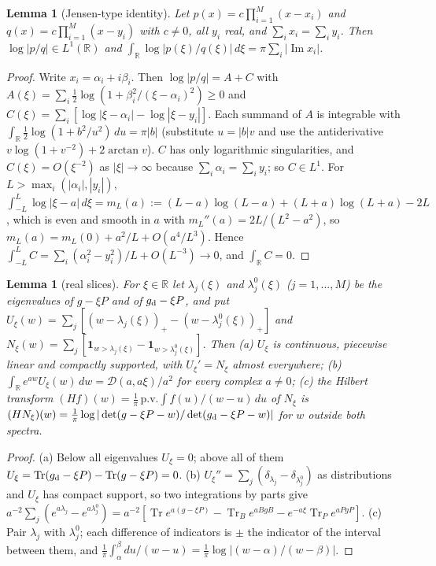 \documentclass[11pt]{amsart}
\newtheorem{lemma}[theorem]{Lemma}
\theoremstyle{definition}
\theoremstyle{remark}
\numberwithin{equation}{section}
\newcommand{\R}{\mathbb{R}}
\newcommand{\Tr}{\operatorname{Tr}}
\newcommand{\one}{\mathbf{1}}
\newcommand{\cD}{\mathcal{D}}
\renewcommand{\Im}{\operatorname{Im}}
\begin{document}
\begin{lemma}[Jensen-type identity]\label{lem:jensen}
Let $p(x)=c\prod_{i=1}^M(x-x_i)$ and $q(x)=c\prod_{i=1}^M(x-y_i)$ with $c\ne0$, all $y_i$ real, and
$\sum_ix_i=\sum_iy_i$. Then $\log|p/q|\in L^1(\R)$ and $\int_\R\log|p(\xi)/q(\xi)|\,d\xi=\pi\sum_i|\Im x_i|$.
\end{lemma}

\begin{proof}
Write $x_i=\alpha_i+i\beta_i$. Then $\log|p/q|=A+C$ with $A(\xi)=\sum_i\frac12\log(1+\beta_i^2/(\xi-\alpha_i)^2)\ge0$
and $C(\xi)=\sum_i[\log|\xi-\alpha_i|-\log|\xi-y_i|]$. Each summand of $A$ is integrable with
$\int_\R\frac12\log(1+b^2/u^2)\,du=\pi|b|$ (substitute $u=|b|v$ and use the antiderivative
$v\log(1+v^{-2})+2\arctan v$). $C$ has only logarithmic singularities, and $C(\xi)=O(\xi^{-2})$ as $|\xi|\to\infty$
because $\sum_i\alpha_i=\sum_iy_i$; so $C\in L^1$. For $L>\max_i(|\alpha_i|,|y_i|)$,
$\int_{-L}^L\log|\xi-a|\,d\xi=m_L(a):=(L-a)\log(L-a)+(L+a)\log(L+a)-2L$, which is even and smooth in $a$ with
$m_L''(a)=2L/(L^2-a^2)$, so $m_L(a)=m_L(0)+a^2/L+O(a^4/L^3)$. Hence
$\int_{-L}^LC=\sum_i(\alpha_i^2-y_i^2)/L+O(L^{-3})\to0$, and $\int_\R C=0$.
\end{proof}

\begin{lemma}[real slices]\label{lem:slices}
For $\xi\in\R$ let $\lambda_j(\xi)$ and $\lambda^0_j(\xi)$ ($j=1,\dots,M$) be the eigenvalues of $g-\xi P$ and of
$g_{\rm d}-\xi P$, and put $U_\xi(w)=\sum_j[(w-\lambda_j(\xi))_+-(w-\lambda^0_j(\xi))_+]$ and
$N_\xi(w)=\sum_j[\one_{w>\lambda_j(\xi)}-\one_{w>\lambda^0_j(\xi)}]$. Then (a) $U_\xi$ is continuous, piecewise linear and
compactly supported, with $U_\xi'=N_\xi$ almost everywhere; (b) $\int_\R e^{aw}U_\xi(w)\,dw=\cD(a,a\xi)/a^2$ for every
complex $a\ne0$; (c) the Hilbert transform $(Hf)(w)=\frac1\pi\,\mathrm{p.v.}\!\int f(u)/(w-u)\,du$ of $N_\xi$ is
$(HN_\xi)(w)=\frac1\pi\log|\det(g-\xi P-w)/\det(g_{\rm d}-\xi P-w)|$ for $w$ outside both spectra.
\end{lemma}

\begin{proof}
(a) Below all eigenvalues $U_\xi=0$; above all of them $U_\xi=\Tr(g_{\rm d}-\xi P)-\Tr(g-\xi P)=0$. (b) $U_\xi''=
\sum_j(\delta_{\lambda_j}-\delta_{\lambda^0_j})$ as distributions and $U_\xi$ has compact support, so two integrations by
parts give $a^{-2}\sum_j(e^{a\lambda_j}-e^{a\lambda^0_j})=a^{-2}[\Tr e^{a(g-\xi P)}-\Tr_Be^{aBgB}-e^{-a\xi}\Tr_Pe^{aPgP}]$.
(c) Pair $\lambda_j$ with $\lambda^0_j$; each difference of indicators is $\pm$ the indicator of the interval between
them, and $\frac1\pi\int_\alpha^\beta du/(w-u)=\frac1\pi\log|(w-\alpha)/(w-\beta)|$.
\end{proof}
\end{document}
